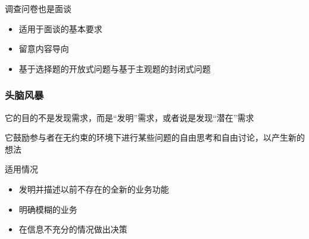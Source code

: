 调查问卷也是面谈
\vspace{-0.8em}
\begin{multicols}{2}
\begin{itemize}
    \item 适用于面谈的基本要求
    \item 留意内容导向
    \item 基于选择题的开放式问题与基于主观题的封闭式问题
\end{itemize}
\end{multicols}
\vspace{-1em}

\subsubsection{头脑风暴}
它的目的不是发现需求，而是“发明”需求，或者说是发现“潜在”需求

它鼓励参与者在无约束的环境下进行某些问题的自由思考和自由讨论，以产生新的想法 

适用情况
\vspace{-0.8em}
\begin{multicols}{2}
\begin{itemize}
    \item 发明并描述以前不存在的全新的业务功能
    \item 明确模糊的业务
    \item 在信息不充分的情况做出决策
\end{itemize}
\end{multicols}
\vspace{-1em}

